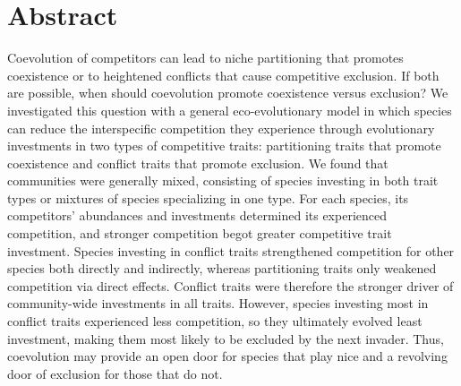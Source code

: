\section*{Abstract}

Coevolution of competitors can lead to niche partitioning that promotes
coexistence or to heightened conflicts that cause competitive exclusion. 
If both are possible, when should coevolution promote coexistence versus
exclusion? We investigated this question with a general eco-evolutionary 
model in which species can reduce the interspecific competition they 
experience through evolutionary investments in two types of competitive traits:
partitioning traits that promote coexistence and conflict traits that promote
exclusion. We found that communities were generally mixed, consisting of species
investing in both trait types or mixtures of species specializing in one type.
For each species, its competitors’ abundances and investments determined its
experienced competition, and stronger competition begot greater competitive
trait investment. Species investing in conflict traits strengthened competition
for other species both directly and indirectly, whereas partitioning traits only
weakened competition via direct effects. Conflict traits were therefore the
stronger driver of community-wide investments in all traits. However, species
investing most in conflict traits experienced less competition, so they
ultimately evolved least investment, making them most likely to be excluded by
the next invader. Thus, coevolution may provide an open door for species that
play nice and a revolving door of exclusion for those that do not. 

